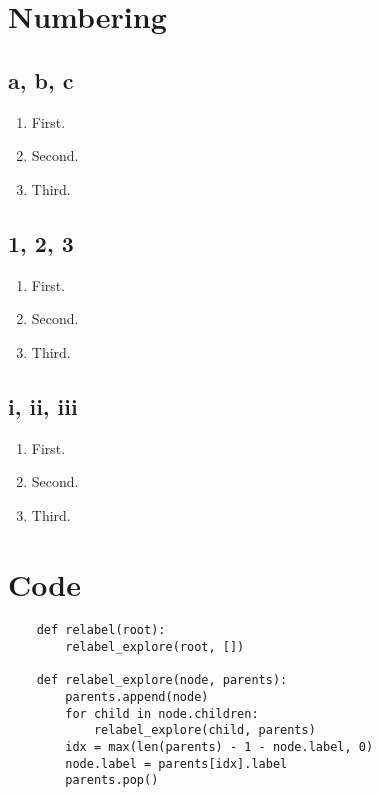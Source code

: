 \documentclass{article}
\title{\vspace{-2cm}\DocumentTitle{}}
\author{\Name{} (SID \StudentID{})}
\date{}
\begin{document}
\maketitle

\section{Numbering}

\subsection{a, b, c}
\begin{enumerate}[label = {\alph*)}]
    \item First.
    \item Second.
    \item Third.
\end{enumerate}

\subsection{1, 2, 3}
\begin{enumerate}[label = {\arabic*)}]
    \item First.
    \item Second.
    \item Third.
\end{enumerate}

\subsection{i, ii, iii}
\begin{enumerate}[label = {\roman*)}]
    \item First.
    \item Second.
    \item Third.
\end{enumerate}

\newpage
\section{Code}

\begin{verbatim}
    def relabel(root):
        relabel_explore(root, [])

    def relabel_explore(node, parents):
        parents.append(node)
        for child in node.children:
            relabel_explore(child, parents)
        idx = max(len(parents) - 1 - node.label, 0)
        node.label = parents[idx].label
        parents.pop()
\end{verbatim}
\end{document}
